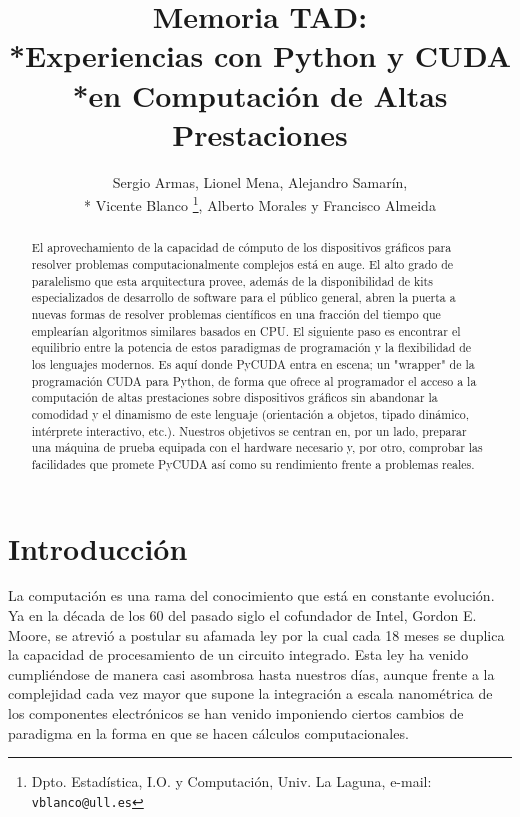 \documentclass[twoside]{article}
\begin{document}
\title{Memoria TAD:\\*Experiencias con Python y CUDA\\*en Computación de Altas Prestaciones}

\author{Sergio Armas, %
     Lionel Mena, %
     Alejandro Samarín,\\*%
     Vicente Blanco%
     \thanks{Dpto. Estadística, I.O. y Computación, Univ. La Laguna, e-mail: {\tt vblanco@ull.es}}, %
     Alberto Morales y %
     Francisco Almeida
}

\maketitle
\markboth{}{}
\pagestyle{empty} 
\thispagestyle{empty} %

\begin{abstract}
El aprovechamiento de la capacidad de cómputo de los dispositivos gráficos para resolver problemas computacionalmente complejos está en auge. El alto grado de paralelismo que esta arquitectura provee, además de la disponibilidad de kits especializados de desarrollo de software para el público general, abren la puerta a nuevas formas de resolver problemas científicos en una fracción del tiempo que emplearían algoritmos similares basados en CPU. El siguiente paso es encontrar el equilibrio entre la potencia de estos paradigmas de programación y la flexibilidad de los lenguajes modernos. Es aquí donde PyCUDA entra en escena; un "wrapper" de la programación CUDA para Python, de forma que ofrece al programador el acceso a la computación de altas prestaciones sobre dispositivos gráficos sin abandonar la comodidad y el dinamismo de este lenguaje (orientación a objetos, tipado dinámico, intérprete interactivo, etc.). Nuestros objetivos se centran en, por un lado, preparar una máquina de prueba equipada con el hardware necesario y, por otro, comprobar las facilidades que promete PyCUDA así como su rendimiento frente a problemas reales.
\end{abstract}


\section{Introducción}
La computación es una rama del conocimiento que está en constante evolución. Ya en la década de los 60 del pasado siglo el cofundador de Intel, Gordon E. Moore, se atrevió a postular su afamada ley por la cual cada 18 meses se duplica la capacidad de procesamiento de un circuito integrado. Esta ley ha venido cumpliéndose de manera casi asombrosa hasta nuestros días, aunque frente a la complejidad cada vez mayor que supone la integración a escala nanométrica de los componentes electrónicos se han venido imponiendo ciertos cambios de paradigma en la forma en que se hacen cálculos computacionales.
\end{document}
